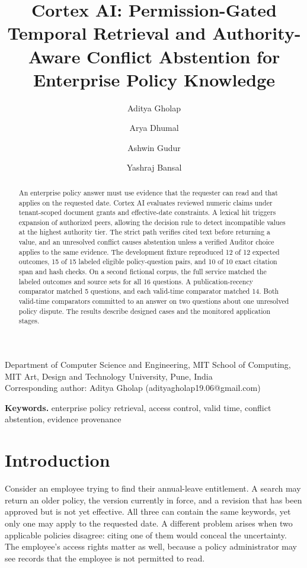 \documentclass[11pt]{article}
\title{Cortex AI: Permission-Gated Temporal Retrieval and
Authority-Aware Conflict Abstention for Enterprise Policy Knowledge}
\author{Aditya Gholap \and Arya Dhumal \and Ashwin Gudur \and Yashraj
Bansal}
\date{}
\begin{document}
\maketitle
\begin{center}\small Department of Computer Science and Engineering, MIT
School of Computing, MIT Art, Design and Technology University, Pune,
India\\Corresponding author: Aditya Gholap
(adityagholap19.06@gmail.com)\end{center}
\begin{abstract}
An enterprise policy answer must use evidence that the requester can
read and that applies on the requested date. Cortex AI evaluates
reviewed numeric claims under tenant-scoped document grants and
effective-date constraints. A lexical hit triggers expansion of
authorized peers, allowing the decision rule to detect incompatible
values at the highest authority tier. The strict path verifies cited
text before returning a value, and an unresolved conflict causes
abstention unless a verified Auditor choice applies to the same
evidence. The development fixture reproduced 12 of 12 expected outcomes,
15 of 15 labeled eligible policy-question pairs, and 10 of 10 exact
citation span and hash checks. On a second fictional corpus, the full
service matched the labeled outcomes and source sets for all 16
questions. A publication-recency comparator matched 5 questions, and
each valid-time comparator matched 14. Both valid-time comparators
committed to an answer on two questions about one unresolved policy
dispute. The results describe designed cases and the monitored
application stages.
\end{abstract}
\noindent\textbf{Keywords.} enterprise policy retrieval, access control,
valid time, conflict abstention, evidence provenance
\section{Introduction}\label{introduction}

Consider an employee trying to find their annual-leave entitlement. A
search may return an older policy, the version currently in force, and a
revision that has been approved but is not yet effective. All three can
contain the same keywords, yet only one may apply to the requested date.
A different problem arises when two applicable policies disagree: citing
one of them would conceal the uncertainty. The employee's access rights
matter as well, because a policy administrator may see records that the
employee is not permitted to read.
\end{document}
